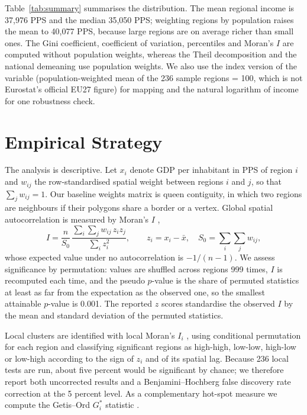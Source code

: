 \documentclass[11pt]{article}
\begin{document}
Table~\ref{tab:summary} summarises the distribution. The mean regional income is 37,976 PPS and the median 35,050 PPS; weighting regions by population raises the mean to 40,077 PPS, because large regions are on average richer than small ones.
The Gini coefficient, coefficient of variation, percentiles and Moran's $I$ are computed without population weights, whereas the Theil decomposition and the national demeaning use population weights. We also use the index version of the variable (population-weighted mean of the 236 sample regions = 100, which is not Eurostat's official EU27 figure) for mapping and the natural logarithm of income for one robustness check.



\section{Empirical Strategy}

The analysis is descriptive. Let $x_i$ denote GDP per inhabitant in PPS of region $i$ and $w_{ij}$ the row-standardised spatial weight between regions $i$ and $j$, so that $\sum_j w_{ij}=1$. Our baseline weights matrix is queen contiguity, in which two regions are neighbours if their polygons share a border or a vertex. Global spatial autocorrelation is measured by Moran's $I$ \citep{moran1950notes},
\begin{equation}
I = \frac{n}{S_0}\,\frac{\sum_i\sum_j w_{ij}\,z_i z_j}{\sum_i z_i^2}, \qquad z_i = x_i - \bar{x}, \quad S_0 = \sum_i\sum_j w_{ij},
\label{eq:moran}
\end{equation}
whose expected value under no autocorrelation is $-1/(n-1)$. We assess significance by permutation: values are shuffled across regions 999 times, $I$ is recomputed each time, and the pseudo $p$-value is the share of permuted statistics at least as far from the expectation as the observed one, so the smallest attainable $p$-value is 0.001. The reported $z$ scores standardise the observed $I$ by the mean and standard deviation of the permuted statistics.

Local clusters are identified with local Moran's $I_i$ \citep{anselin1995local}, using conditional permutation for each region and classifying significant regions as high-high, low-low, high-low or low-high according to the sign of $z_i$ and of its spatial lag. Because 236 local tests are run, about five percent would be significant by chance; we therefore report both uncorrected results and a Benjamini--Hochberg false discovery rate correction at the 5 percent level. As a complementary hot-spot measure we compute the Getis--Ord $G_i^*$ statistic \citep{getis1992analysis}.
\end{document}
